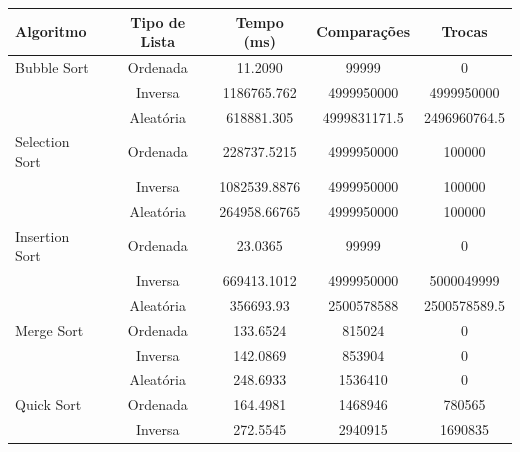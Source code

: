 \documentclass[tcc2]{uftex}
\begin{document}
\begin{table}[h!]
\centering
\begin{tabular}{|l|c|c|c|c|}
\hline
\textbf{Algoritmo} & \textbf{Tipo de Lista} & \textbf{Tempo (ms)} & \textbf{Comparações} & \textbf{Trocas} \\ \hline
Bubble Sort       & Ordenada                & 11.2090                & 99999                & 0   \\ \cline{2-5}
                   & Inversa                 & 1186765.762                & 4999950000                & 4999950000   \\ \cline{2-5}
                   & Aleatória               & 618881.305                & 4999831171.5                 & 2496960764.5   \\ \hline
Selection Sort    & Ordenada                & 228737.5215                 & 4999950000                 & 100000   \\ \cline{2-5}
                   & Inversa                 & 1082539.8876                 & 4999950000                 & 100000   \\ \cline{2-5}
                   & Aleatória               & 264958.66765                 & 4999950000                 & 100000   \\ \hline
Insertion Sort    & Ordenada                & 23.0365                 & 99999                 & 0   \\ \cline{2-5}
                   & Inversa                 & 669413.1012                 & 4999950000                 & 5000049999   \\ \cline{2-5}
                   & Aleatória               & 356693.93                 & 2500578588                 & 2500578589.5   \\ \hline
Merge Sort        & Ordenada                & 133.6524                 & 815024                 & 0    \\ \cline{2-5}
                   & Inversa                 & 142.0869                 & 853904                 & 0    \\ \cline{2-5}
                   & Aleatória               & 248.6933                 & 1536410                 & 0    \\ \hline
Quick Sort        & Ordenada                & 164.4981                 & 1468946                 & 780565    \\ \cline{2-5}
                   & Inversa                 & 272.5545                 & 2940915                 & 1690835    \\ \cline{2-5}

\end{tabular}
\end{table}
\end{document}
